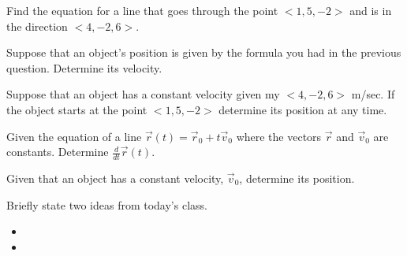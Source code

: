 \begin{problem}
\item Find the equation for a line that goes through the point
  $<1,5,-2>$  and is in the direction  $<4,-2,6>$.

  \vfill

\item Suppose that an object's position is given by the formula you
  had in the previous question. Determine its velocity.

  \vfill

\clearpage
\item Suppose that an object has a constant velocity given my
  $<4,-2,6>$ m/sec. If the object starts at the point $<1,5,-2>$
  determine its position at any time.

  \vfill

\item Given the equation of a line $\vec{r}(t)=\vec{r}_0 + t \vec{v}_0$ where the vectors $\vec{r}$ and $\vec{v}_0$ are constants. Determine $\frac{d}{dt}\vec{r}(t)$.
  \vfill

\item Given that an object has a constant velocity,  $\vec{v}_0$, determine its position.
  \vfill

\end{problem}


\postClass

\begin{problem}
\item Briefly state two ideas from today's class.
  \begin{itemize}
  \item
  \item
  \end{itemize}
\item
  \begin{subproblem}
    \item
  \end{subproblem}
\end{problem}


